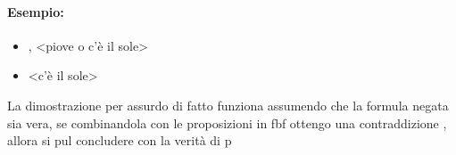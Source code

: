 \documentclass[12pt, a4paper, openany, oneside]{book}
\begin{document}
\paragraph{Esempio:} 
\begin{itemize}
	\item <non piove>, <piove o c'è il sole>
	\item <c'è il sole>
\end{itemize}
La dimostrazione per assurdo di fatto funziona assumendo che la formula negata
sia vera, se combinandola con le proposizioni in fbf ottengo una contraddizione
, allora si pul concludere con la verità di p
 
\end{document}
